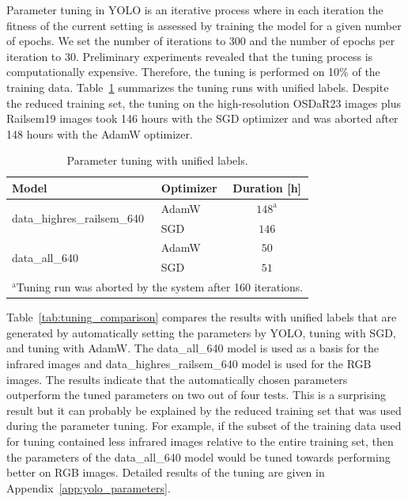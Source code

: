 \documentclass[Master,MDS,english]{BASE/twbook} %
\begin{document}
Parameter tuning in YOLO is an iterative process where in each iteration the fitness of the current setting is assessed by training the model for a given number of epochs. We set the number of iterations to 300 and the number of epochs per iteration to 30.  Preliminary experiments revealed that the tuning process is computationally expensive. Therefore, the tuning is performed on 10\% of the training data. 
Table~\ref{tab:model_duration} summarizes the tuning runs with unified labels. %
Despite the reduced training set, the tuning on the high-resolution OSDaR23 images plus Railsem19 images took 146 hours with the SGD optimizer and was aborted after 148 hours with the AdamW optimizer.  

\begin{table}[htbp]
\centering
\footnotesize
\begin{tabular}{|llc|}
\toprule
\textbf{Model} & \textbf{Optimizer} & \textbf{Duration [h]} \\ 
\midrule
\multirow{2}{*}{data\_highres\_railsem\_640} & AdamW & $148^\mathrm{a}$\\
& SGD & $146$ \\
\midrule
\multirow{2}{*}{data\_all\_640} & AdamW & $50$ \\
& SGD & $51$ \\
\bottomrule
\multicolumn{3}{l}{$^{\mathrm{a}}$Tuning run was aborted by the system after 160 iterations.} \\
\end{tabular}
\caption{Parameter tuning with unified labels.}
\label{tab:model_duration}
\end{table}

Table~\ref{tab:tuning_comparison} compares the results with unified labels that are generated by automatically setting the parameters by YOLO, tuning with SGD, and tuning with AdamW. The data\_all\_640 model is used as a basis for the infrared images and data\_highres\_railsem\_640 model is used for the RGB images.
The results indicate that the automatically chosen parameters outperform the tuned parameters on two out of four tests. This is a surprising result but it can probably be explained by the reduced training set that was used during the parameter tuning. For example, if the subset of the training data used for tuning contained less infrared images relative to the entire training set, then the parameters of the data\_all\_640 model would be tuned towards performing better on RGB images. Detailed results of the tuning are given in Appendix~\ref{app:yolo_parameters}.
\end{document}
